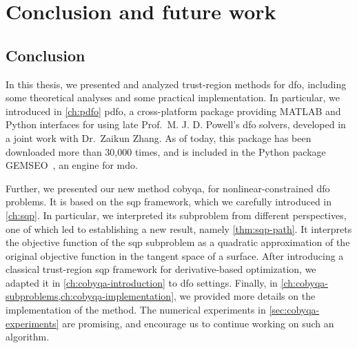 %
%
%
\chapter*{Conclusion and future work}
\label{ch:conclusion}

\section*{Conclusion}

In this thesis, we presented and analyzed trust-region methods for \gls{dfo}, including some theoretical analyses and some practical implementation.
In particular, we introduced in \cref{ch:pdfo} \gls{pdfo}, a cross-platform package providing MATLAB and Python interfaces for using late Prof.\ M. J. D. Powell's \gls{dfo} solvers, developed in a joint work with Dr.\ Zaikun Zhang.
As of today, this package has been downloaded more than 30,000 times, and is included in the Python package GEMSEO~\cite{Gallard_Etal_2018}, an engine for \gls{mdo}.

Further, we presented our new method \gls{cobyqa}, for nonlinear-constrained \gls{dfo} problems.
It is based on the \gls{sqp} framework, which we carefully introduced in \cref{ch:sqp}.
In particular, we interpreted its subproblem from different perspectives, one of which led to establishing a new result, namely \cref{thm:sqp-path}.
It interprets the objective function of the \gls{sqp} subproblem as a quadratic approximation of the original objective function in the tangent space of a surface.
After introducing a classical trust-region \gls{sqp} framework for derivative-based optimization, we adapted it in \cref{ch:cobyqa-introduction} to \gls{dfo} settings.
Finally, in \cref{ch:cobyqa-subproblems,ch:cobyqa-implementation}, we provided more details on the implementation of the method.
The numerical experiments in \cref{sec:cobyqa-experiments} are promising, and encourage us to continue working on such an algorithm.

